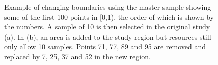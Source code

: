 \documentclass[titlepage]{article}
\begin{document}
\begin{figure}[H]
	\centering
	\hfill
	\caption{Example of changing boundaries using the master sample showing some of the first 100 points in [0,1), the order of which is shown by the numbers. A sample of 10 is then selected in the original study (a). In (b), an area is added to the study region but resources still only allow 10 samples. Points 71, 77, 89 and 95 are removed and replaced by 7, 25, 37 and 52 in the new region.}\label{CB}
\end{figure}

\newpage
\end{document}
